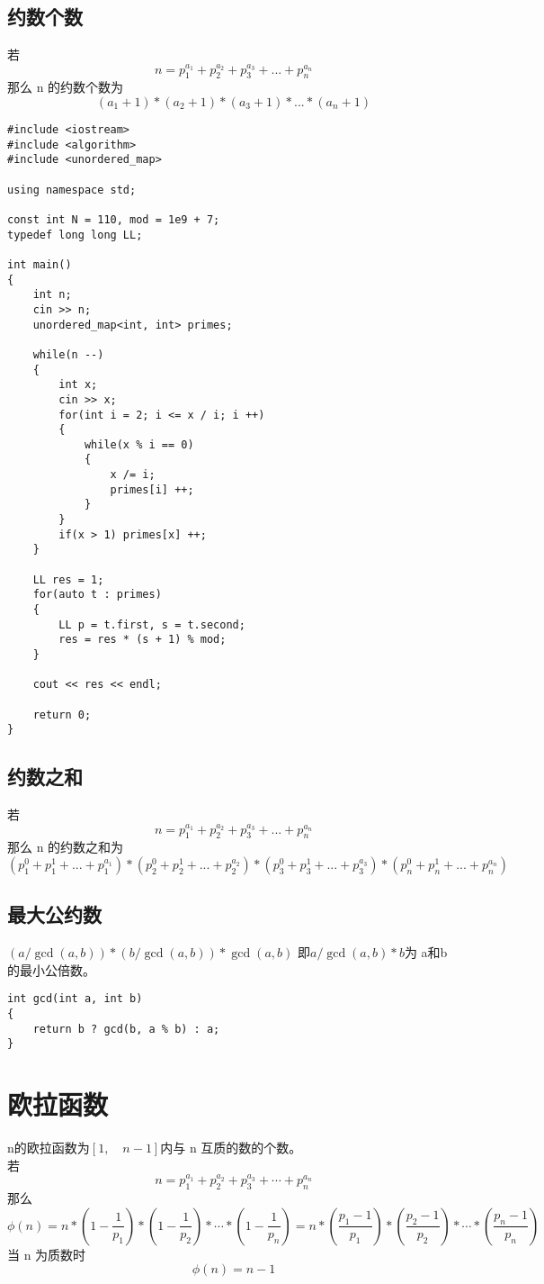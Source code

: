 \documentclass[]{book}
\begin{document}
\section{约数个数}
若 
$$n = p_{1}^{a_{1}} + p_{2}^{a_{2}} + p_{3}^{a_{3}} +...+ p_{n}^{a_{n}}$$
那么 n 的约数个数为
$$(a_{1} + 1) * (a_{2} + 1) * (a_{3} + 1) *...* (a_{n} + 1)$$
\begin{lstlisting}
#include <iostream>
#include <algorithm>
#include <unordered_map>

using namespace std;

const int N = 110, mod = 1e9 + 7;
typedef long long LL;

int main()
{
    int n;
    cin >> n;
    unordered_map<int, int> primes;
    
    while(n --)
    {
        int x;
        cin >> x;
        for(int i = 2; i <= x / i; i ++)
        {
            while(x % i == 0)
            {
                x /= i;
                primes[i] ++;
            }
        }
        if(x > 1) primes[x] ++;
    }
    
    LL res = 1;
    for(auto t : primes)
    {
        LL p = t.first, s = t.second;
        res = res * (s + 1) % mod;
    }
    
    cout << res << endl;
    
    return 0;
}
\end{lstlisting}
\section{约数之和}
若
$$n = p_{1}^{a_{1}} + p_{2}^{a_{2}} + p_{3}^{a_{3}} +...+ p_{n}^{a_{n}}$$
那么 n 的约数之和为
$$(p_{1}^{0} + p_{1}^{1} + ... + p_{1}^{a_{1}}) * (p_{2}^{0} + p_{2}^{1} + ... + p_{2}^{a_{2}}) * (p_{3}^{0} + p_{3}^{1} + ... + p_{3}^{a_{3}}) * (p_{n}^{0} + p_{n}^{1} + ... + p_{n}^{a_{n}})$$
\section{最大公约数}
$(a / \gcd(a, b)) * (b / \gcd(a, b))* \gcd(a, b)$ 即$a / \gcd(a, b) * b$为 a和b 的最小公倍数。
\begin{lstlisting}
int gcd(int a, int b)
{
    return b ? gcd(b, a % b) : a;
}
\end{lstlisting}
\chapter{欧拉函数}
n的欧拉函数为$[1,\quad n - 1]$内与 n 互质的数的个数。\\
若 
\[n = p_{1}^{a_{1}} + p_{2}^{a_{2}} + p_{3}^{a_{3}} +\cdots + p_{n}^{a_{n}}\]
那么
\[\phi(n) = n * (1 - \frac{1}{p_{1}}) * (1 - \frac{1}{p_{2}}) *\cdots* (1 - \frac{1}{p_{n}}) = 
n*(\frac{p_{1} - 1}{p_{1}})*(\frac{p_{2} - 1}{p_{2}})*\cdots *(\frac{p_{n} - 1}{p_{n}})\]
当 n 为质数时
\[\phi(n) = n - 1\]
\end{document}
